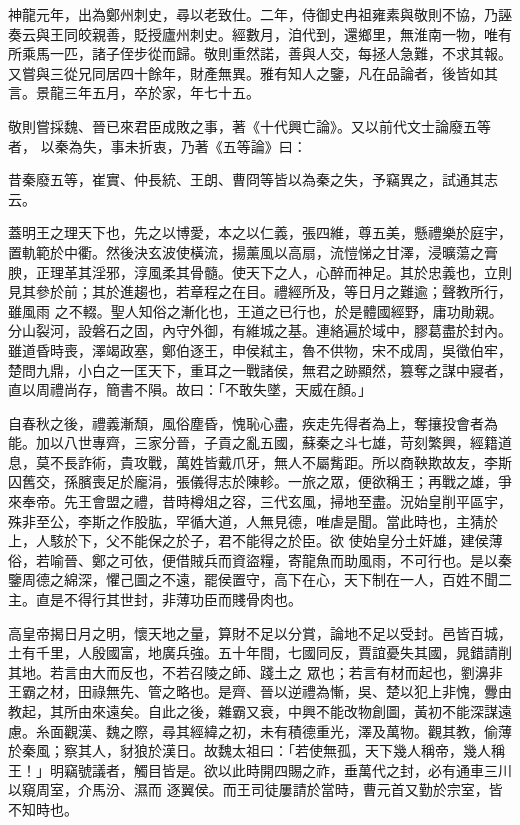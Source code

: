 \begin{pinyinscope}
 神龍元年，出為鄭州刺史，尋以老致仕。二年，侍御史冉祖雍素與敬則不協，乃誣奏云與王同皎親善，貶授廬州刺史。經數月，洎代到，還鄉里，無淮南一物，唯有所乘馬一匹，諸子侄步從而歸。敬則重然諾，善與人交，每拯人急難，不求其報。又嘗與三從兄同居四十餘年，財產無異。雅有知人之鑒，凡在品論者，後皆如其言。景龍三年五月，卒於家，年七十五。



 敬則嘗採魏、晉已來君臣成敗之事，著《十代興亡論》。又以前代文士論廢五等者，
 以秦為失，事未折衷，乃著《五等論》曰：



 昔秦廢五等，崔實、仲長統、王朗、曹冏等皆以為秦之失，予竊異之，試通其志云。



 蓋明王之理天下也，先之以博愛，本之以仁義，張四維，尊五美，懸禮樂於庭宇，置軌範於中衢。然後決玄波使橫流，揚薰風以高扇，流愷悌之甘澤，浸曠蕩之膏腴，正理革其淫邪，淳風柔其骨髓。使天下之人，心醉而神足。其於忠義也，立則見其參於前；其於進趨也，若章程之在目。禮經所及，等日月之難逾；聲教所行，雖風雨
 之不輟。聖人知俗之漸化也，王道之已行也，於是體國經野，庸功勛親。分山裂河，設磐石之固，內守外御，有維城之基。連絡遍於域中，膠葛盡於封內。雖道昏時喪，澤竭政塞，鄭伯逐王，申侯弒主，魯不供物，宋不成周，吳徵伯牢，楚問九鼎，小白之一匡天下，重耳之一戰諸侯，無君之跡顯然，篡奪之謀中寢者，直以周禮尚存，簡書不隕。故曰：「不敢失墜，天威在顏。」



 自春秋之後，禮義漸頹，風俗塵昏，愧恥心盡，疾走先得者為上，奪攘投會者為
 能。加以八世專齊，三家分晉，子貢之亂五國，蘇秦之斗七雄，苛刻繁興，經籍道息，莫不長詐術，貴攻戰，萬姓皆戴爪牙，無人不屬觜距。所以商鞅欺故友，李斯囚舊交，孫臏喪足於龐涓，張儀得志於陳軫。一旅之眾，便欲稱王；再戰之雄，爭來奉帝。先王會盟之禮，昔時樽俎之容，三代玄風，掃地至盡。況始皇削平區宇，殊非至公，李斯之作股肱，罕循大道，人無見德，唯虐是聞。當此時也，主猜於上，人駭於下，父不能保之於子，君不能得之於臣。欲
 使始皇分土奸雄，建侯薄俗，若喻晉、鄭之可依，便借賊兵而資盜糧，寄龍魚而助風雨，不可行也。是以秦鑒周德之綿深，懼己圖之不遠，罷侯置守，高下在心，天下制在一人，百姓不聞二主。直是不得行其世封，非薄功臣而賤骨肉也。



 高皇帝揭日月之明，懷天地之量，算財不足以分賞，論地不足以受封。邑皆百城，土有千里，人殷國富，地廣兵強。五十年間，七國同反，賈誼憂失其國，晁錯請削其地。若言由大而反也，不若召陵之師、踐土之
 眾也；若言有材而起也，劉濞非王霸之材，田祿無先、管之略也。是齊、晉以逆禮為慚，吳、楚以犯上非愧，釁由教起，其所由來遠矣。自此之後，雜霸又衰，中興不能改物創圖，黃初不能深謀遠慮。糸面觀漢、魏之際，尋其經緯之初，未有積德重光，澤及萬物。觀其教，偷薄於秦風；察其人，豺狼於漢日。故魏太祖曰：「若使無孤，天下幾人稱帝，幾人稱王！」明竊號議者，觸目皆是。欲以此時開四賜之祚，垂萬代之封，必有通車三川以窺周室，介馬汾、濕而
 逐翼侯。而王司徒屢請於當時，曹元首又勤於宗室，皆不知時也。




\end{pinyinscope}
